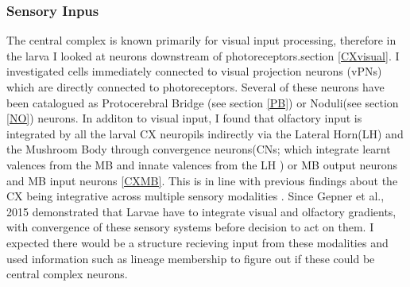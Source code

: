      \subsubsection{Sensory Inpus} 
    The central complex is known primarily for visual input processing, therefore in the larva I looked at neurons downstream of photoreceptors.section \ref{CXvisual}. I investigated cells immediately connected to visual projection neurons (vPNs) which are directly connected to photoreceptors. Several of these neurons have been catalogued as Protocerebral Bridge (see section \ref{PB}) or Noduli(see section \ref{NO}) neurons. 
    In additon to visual input, I found that olfactory input is integrated by all the larval CX neuropils indirectly via the Lateral Horn(LH) and the Mushroom Body through convergence neurons(CNs; which integrate learnt valences from the MB and innate valences from the LH \citep{eschbach2021circuits}) or MB output neurons and MB input neurons \ref{CXMB}. This is in line with previous findings about the CX being integrative across multiple sensory modalities \citep{hulse2021connectome}. Since Gepner et al., 2015 demonstrated that Larvae  have to integrate visual and olfactory gradients, with convergence of these sensory systems before decision to act on them. I expected there would be a structure recieving input from these modalities and used information such as lineage membership to figure out if these could be central complex neurons. 

